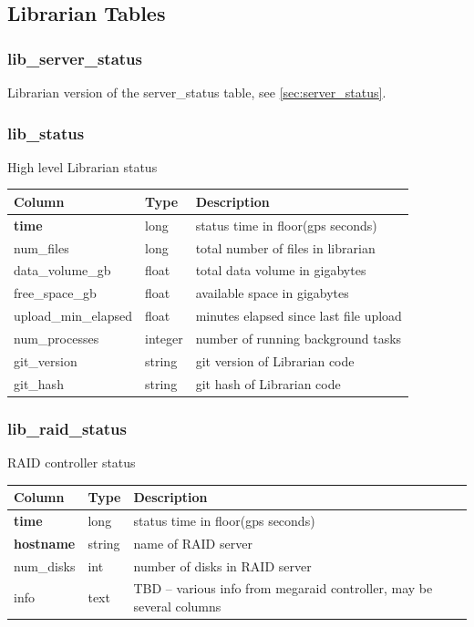\documentclass{article}
\begin{document}
{%

\subsection{Librarian Tables}
\subsubsection{lib\_server\_status}
Librarian version of the server\_status table, see \ref{sec:server_status}.

\subsubsection{lib\_status}
High level Librarian status
\begin{center}
 \begin{tabular}{| p{4cm} | p{2cm} | p{10cm} |}
\hline
 {\bf Column} & {\bf Type}  & {\bf Description} \\ [0.5ex]  \hline\hline
\textbf{time} & long & status time in floor(gps seconds) \\ \hline
num\_files & long & total number of files in librarian  \\\hline
data\_volume\_gb & float & total data volume in gigabytes  \\\hline
free\_space\_gb & float & available space in gigabytes  \\\hline
upload\_min\_elapsed & float & minutes elapsed since last file upload \\\hline
num\_processes & integer & number of running background tasks  \\\hline
git\_version & string & git version of Librarian code  \\\hline
git\_hash & string & git hash of Librarian code  \\\hline
\end{tabular}
\end{center}

\subsubsection{lib\_raid\_status}
RAID controller status
\begin{center}
 \begin{tabular}{| p{4cm} | p{2cm} | p{10cm} |}
\hline
 {\bf Column} & {\bf Type}  & {\bf Description} \\ [0.5ex]  \hline\hline
\textbf{time} & long & status time in floor(gps seconds) \\ \hline
\textbf{hostname} & string & name of RAID server \\ \hline
num\_disks & int & number of disks in RAID server  \\\hline
info & text & TBD -- various info from megaraid controller, may be several columns \\\hline
\end{tabular}
\end{center}

}
\end{document}
